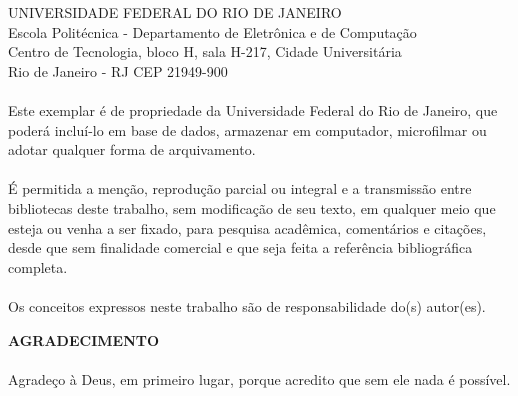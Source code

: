 \pagebreak

\vspace{0.5cm}

UNIVERSIDADE FEDERAL DO RIO DE JANEIRO \\
Escola Politécnica - Departamento de Eletrônica e de Computação \\
Centro de Tecnologia, bloco H, sala H-217, Cidade Universitária \\
Rio de Janeiro - RJ      CEP 21949-900\\
\vspace{0.5cm}
\paragraph{}Este exemplar é de propriedade da Universidade Federal do Rio de Janeiro, que poderá incluí-lo em base de dados, armazenar em computador, microfilmar ou adotar qualquer forma de arquivamento.
\paragraph{}É permitida a menção, reprodução parcial ou integral e a transmissão entre bibliotecas deste trabalho, sem modificação de seu texto, em qualquer meio que esteja ou venha a ser fixado, para pesquisa acadêmica, comentários e citações, desde que sem finalidade comercial e que seja feita a referência bibliográfica completa.
\paragraph{}Os conceitos expressos neste trabalho são de responsabilidade do(s) autor(es).


\pagebreak





\begin{center}
	\textbf{AGRADECIMENTO}
\end{center}
\vspace{0.5cm}

\paragraph{}Agradeço à Deus, em primeiro lugar, porque acredito que sem ele nada é possível.

